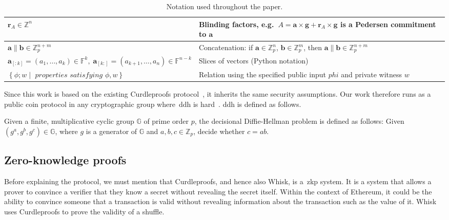 \begin{table*}[!htb]
\begin{tabular}{|l|l|}
        \hline
        $\mathbf{r}_A\in\mathbb{Z}^n$ & Blinding factors, e.g.\ $A=\mathbf{a}\times\mathbf{g} + \mathbf{r}_A \times \mathbf{g}$ is a Pedersen commitment to $\mathbf{a}$ \\
        \hline
        $\mathbf{a}\parallel \mathbf{b}\in\mathbb{Z}_p^{n+m}$
        & Concatenation: if $\mathbf{a}\in\mathbb{Z}_p^n$, $\mathbf{b}\in\mathbb{Z}_p^m$, then $\mathbf{a}\parallel \mathbf{b}\in\mathbb{Z}_p^{n+m}$ \\
        \hline
        $\mathbf{a}_{[:k]}=(a_1,\dots,a_k)\in\mathbb{F}^k, \; \mathbf{a}_{[k:]}=(a_{k+1},\dots,a_n)\in\mathbb{F}^{n-k}$
        & Slices of vectors (Python notation) \\
        \hline
        $\left\{\phi; w\middle|\textit{ properties satisfying }\phi,w\right\}$
        & Relation using the specified public input $phi$ and private witness $w$ \\
        \hline
    \end{tabular}
    \caption{Notation used throughout the paper.}
    \label{tab:notation}
\end{table*}


Since this work is based on the existing Curdleproofs protocol~\cite{Curdleproofs}, it inherits the same security assumptions.
Our work therefore runs as a public coin protocol in any cryptographic group where~\gls{ddh} is hard~\cite{10.1007/BFb0054851}.
\gls{ddh} is defined as follows.

\begin{definition}[DDH]
 Given a finite, multiplicative cyclic group $\mathbb{G}$ of prime order $p$, the decisional Diffie-Hellman problem is defined as follows: Given $(g^a,g^b,g^c)\in\mathbb{G}$, where $g$ is a generator of $\mathbb{G}$ and $a,b,c\in\mathbb{Z}_p$, decide whether $c=ab$.
\end{definition}

\subsection{Zero-knowledge proofs}\label{sec:background-zkps}
Before explaining the protocol, we must mention that Curdleproofs, and hence also Whisk, is a~\gls{zkp} system.
It is a system that allows a prover to convince a verifier that they know a secret without revealing the secret itself.
Within the context of Ethereum, it could be the ability to convince someone that a transaction is valid without revealing information about the transaction such as the value of it.
Whisk uses Curdleproofs to prove the validity of a shuffle.

